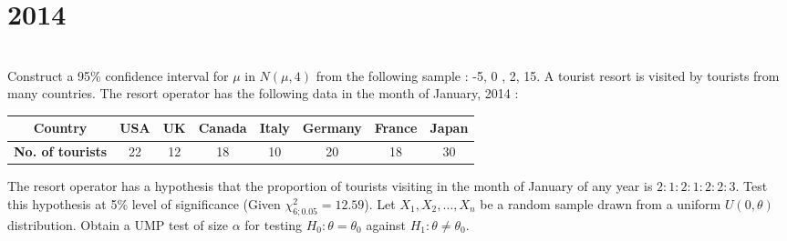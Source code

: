 \section*{2014}
\vspace{-.5cm}
\hrulefill \smallskip\\
 Construct a 95\% confidence interval for $\mu$ in $N(\mu,4)$ from the following sample : -5, 0 , 2, 15.
\myline
{} A tourist resort is visited by tourists from many countries. The resort operator has the following data in the month of January, 2014 : 
\begin{center}
    \begin{tabular}{|*{8}{c|}} \hline
        \textbf{Country} & USA & UK & Canada & Italy & Germany & France & Japan\\\hline
        \textbf{No. of tourists} & 22 & 12 & 18 & 10 & 20 & 18 & 30\\\hline \end{tabular}
\end{center} The resort operator has a hypothesis that the proportion of tourists visiting in the month of January of any year is $2:1:2:1:2:2:3$. Test this hypothesis at 5\% level of significance (Given $\chi_{6; 0.05}^2 = 12.59$). 
\myline
{} Let $X_1, X_2,\ldots,X_n$ be a random sample drawn from a uniform $U(0,\theta)$ distribution. Obtain a UMP test of size $\alpha$ for testing $H_0: \theta = \theta_0$ against $H_1: \theta\neq\theta_0$.